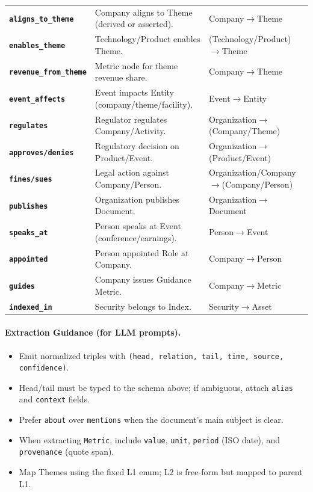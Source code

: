 \documentclass[11pt]{article}
\begin{document}
\begin{longtable}{>{\bfseries}p{3.8cm} p{9.6cm} p{2.1cm}}
\texttt{aligns\_to\_theme} & Company aligns to Theme (derived or asserted). & Company$\to$Theme \\
\texttt{enables\_theme} & Technology/Product enables Theme. & (Technology/Product)$\to$Theme \\
\texttt{revenue\_from\_theme} & Metric node for theme revenue share. & Company$\to$Theme \\
\texttt{event\_affects} & Event impacts Entity (company/theme/facility). & Event$\to$Entity \\
\texttt{regulates} & Regulator regulates Company/Activity. & Organization$\to$(Company/Theme) \\
\texttt{approves/denies} & Regulatory decision on Product/Event. & Organization$\to$(Product/Event) \\
\texttt{fines/sues} & Legal action against Company/Person. & Organization/Company$\to$(Company/Person) \\
\texttt{publishes} & Organization publishes Document. & Organization$\to$Document \\
\texttt{speaks\_at} & Person speaks at Event (conference/earnings). & Person$\to$Event \\
\texttt{appointed} & Person appointed Role at Company. & Company$\to$Person \\
\texttt{guides} & Company issues Guidance Metric. & Company$\to$Metric \\
\texttt{indexed\_in} & Security belongs to Index. & Security$\to$Asset \\
\bottomrule
\end{longtable}

\paragraph{Extraction Guidance (for LLM prompts).}
\begin{itemize}[leftmargin=*]
\item Emit normalized triples with \texttt{(head, relation, tail, time, source, confidence)}.
\item Head/tail must be typed to the schema above; if ambiguous, attach \texttt{alias} and \texttt{context} fields.
\item Prefer \texttt{about} over \texttt{mentions} when the document's main subject is clear.
\item When extracting \texttt{Metric}, include \texttt{value}, \texttt{unit}, \texttt{period} (ISO date), and \texttt{provenance} (quote span).
\item Map Themes using the fixed L1 enum; L2 is free-form but mapped to parent L1.
\end{itemize}
\end{document}
